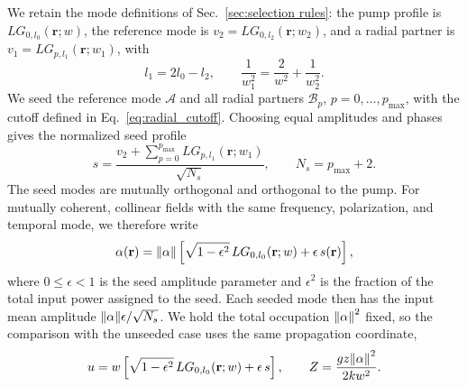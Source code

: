 \documentclass[%
 reprint,
 amsmath,amssymb,
 aps,
pra,
twocolumn,
]{revtex4-2}
\begin{document}
We retain the mode definitions of Sec.~\ref{sec:selection rules}: the pump profile is $LG_{0,l_0}(\mathbf r;w)$, the reference mode is $v_2=LG_{0,l_2}(\mathbf r;w_2)$, and a radial partner is $v_1=LG_{p,l_1}(\mathbf r;w_1)$, with
\begin{equation}
    l_1=2l_0-l_2,\qquad
    \frac{1}{w_1^2}=\frac{2}{w^2}+\frac{1}{w_2^2}.
    \label{eq:seed_detection_family}
\end{equation}
We seed the reference mode $\mathcal A$ and all radial partners $\mathcal B_p$, $p=0,\ldots,p_{\max}$, with the cutoff defined in Eq.~\eqref{eq:radial_cutoff}.
Choosing equal amplitudes and phases gives the normalized seed profile
\begin{equation}
    s=\frac{v_2+\sum_{p=0}^{p_{\max}}LG_{p,l_1}(\mathbf r;w_1)}{\sqrt{N_s}},
    \qquad N_s=p_{\max}+2.
    \label{eq:multiseed_input}
\end{equation}
The seed modes are mutually orthogonal and orthogonal to the pump. For mutually coherent, collinear fields with the same frequency, polarization, and temporal mode, we therefore write
\begin{equation}
    \alpha(\mathbf r)=\norm{\alpha}
    \left[\sqrt{1-\epsilon^2}\,LG_{0,l_0}(\mathbf r;w)+\epsilon\,s(\mathbf r)\right],
    \label{eq:seed_input}
\end{equation}
where $0\le\epsilon<1$ is the seed amplitude parameter and $\epsilon^2$ is the fraction of the total input power assigned to the seed. Each seeded mode then has the input mean amplitude $\norm{\alpha}\epsilon/\sqrt{N_s}$. We hold the total occupation $\norm{\alpha}^2$ fixed, so the comparison with the unseeded case uses the same propagation coordinate,
\begin{equation}
    u=w\left[\sqrt{1-\epsilon^2}\,LG_{0,l_0}(\mathbf r;w)+\epsilon\,s\right],
    \qquad Z=\frac{gz\norm{\alpha}^2}{2kw^2}.
    \label{eq:seed_normalization}
\end{equation}
\end{document}
